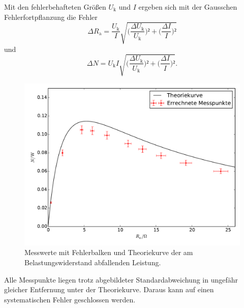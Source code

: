 Mit den fehlerbehafteten Größen $U_\mathup{k}$ und $I$ ergeben sich mit der Gausschen Fehlerfortpflanzung die Fehler
\begin{equation}
\Delta{R_\mathup{a}}=\frac{U_\mathup{k}}{I}
\sqrt{\biggl(\frac{\Delta{U_\mathup{k}}}{U_\mathup{k}}\biggr)²+\biggl(\frac{\Delta{I}}{I}\biggr)²}
\end{equation}
und
\begin{equation}
\Delta{N}=U_\mathup{k}I\sqrt{\biggl(\frac{\Delta{U_\mathup{k}}}{U_\mathup{k}}\biggr)²+\biggl(\frac{\Delta{I}}{I}\biggr)²}.
\end{equation}
\begin{figure}[h]
	\centering
	\label{fig:N}
	\includegraphics[width=\textwidth]{content/plot_L.pdf}
	\caption{Messwerte mit Fehlerbalken und Theoriekurve der am Belastungswiderstand abfallenden Leistung.}
\end{figure}

Alle Messpunkte liegen trotz abgebildeter Standardabweichung in ungefähr gleicher Entfernung unter der Theoriekurve. Daraus kann auf einen systematischen Fehler geschlossen werden.
